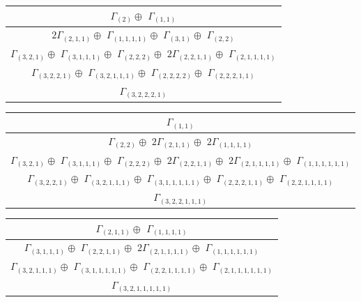 \documentclass[main.tex]{subfiles}
\begin{document}
\begin{minipage}{.5\textwidth}
\centering
\begin{tabular}{c}
$\Gamma_{(
2
)} \oplus$
$\Gamma_{(
1 , 
1
)}$
\\ \hline
$2\Gamma_{(
2 , 
1 , 
1
)} \oplus$
$\Gamma_{(
1 , 
1 , 
1 , 
1
)} \oplus$
$\Gamma_{(
3 , 
1
)} \oplus$
$\Gamma_{(
2 , 
2
)}$
\\ \hline
$\Gamma_{(
3 , 
2 , 
1
)} \oplus$
$\Gamma_{(
3 , 
1 , 
1 , 
1
)} \oplus$
$\Gamma_{(
2 , 
2 , 
2
)} \oplus$
$2\Gamma_{(
2 , 
2 , 
1 , 
1
)} \oplus$
$\Gamma_{(
2 , 
1 , 
1 , 
1 , 
1
)}$
\\ \hline
$\Gamma_{(
3 , 
2 , 
2 , 
1
)} \oplus$
$\Gamma_{(
3 , 
2 , 
1 , 
1 , 
1
)} \oplus$
$\Gamma_{(
2 , 
2 , 
2 , 
2
)} \oplus$
$\Gamma_{(
2 , 
2 , 
2 , 
1 , 
1
)}$
\\ \hline
$\Gamma_{(
3 , 
2 , 
2 , 
2 , 
1
)}$
\\
\end{tabular}\end{minipage}
\bigskip
\begin{minipage}{1\textwidth}
\centering
\begin{tabular}{c}
$\Gamma_{(
1 , 
1
)}$
\\ \hline
$\Gamma_{(
2 , 
2
)} \oplus$
$2\Gamma_{(
2 , 
1 , 
1
)} \oplus$
$2\Gamma_{(
1 , 
1 , 
1 , 
1
)} $
\\ \hline
$\Gamma_{(
3 , 
2 , 
1
)} \oplus$
$\Gamma_{(
3 , 
1 , 
1 , 
1
)} \oplus$
$\Gamma_{(
2 , 
2 , 
2
)} \oplus$
$2\Gamma_{(
2 , 
2 , 
1 , 
1
)} \oplus$
$2\Gamma_{(
2 , 
1 , 
1 , 
1 , 
1
)} \oplus$
$\Gamma_{(
1 , 
1 , 
1 , 
1 , 
1 , 
1
)}$
\\ \hline
$\Gamma_{(
3 , 
2 , 
2 , 
1
)} \oplus$
$\Gamma_{(
3 , 
2 , 
1 , 
1 , 
1
)} \oplus$
$\Gamma_{(
3 , 
1 , 
1 , 
1 , 
1 , 
1
)} \oplus$
$\Gamma_{(
2 , 
2 , 
2 , 
1 , 
1
)} \oplus$
$\Gamma_{(
2 , 
2 , 
1 , 
1 , 
1 , 
1
)}$
\\ \hline
$\Gamma_{(
3 , 
2 , 
2 , 
1 , 
1 , 
1
)}$
\\
\end{tabular}\end{minipage}
\bigskip
\begin{minipage}{.55\textwidth}
\centering
\begin{tabular}{c}
$\Gamma_{(
2 , 
1 , 
1
)} \oplus$
$\Gamma_{(
1 , 
1 , 
1 , 
1
)}$
\\ \hline
$\Gamma_{(
3 , 
1 , 
1 , 
1
)} \oplus$
$\Gamma_{(
2 , 
2 , 
1 , 
1
)} \oplus$
$2\Gamma_{(
2 , 
1 , 
1 , 
1 , 
1
)} \oplus$
$\Gamma_{(
1 , 
1 , 
1 , 
1 , 
1 , 
1
)}$
\\ \hline
$\Gamma_{(
3 , 
2 , 
1 , 
1 , 
1
)} \oplus$
$\Gamma_{(
3 , 
1 , 
1 , 
1 , 
1 , 
1
)} \oplus$
$\Gamma_{(
2 , 
2 , 
1 , 
1 , 
1 , 
1
)} \oplus$
$\Gamma_{(
2 , 
1 , 
1 , 
1 , 
1 , 
1 , 
1
)}$
\\ \hline
$\Gamma_{(
3 , 
2 , 
1 , 
1 , 
1 , 
1 , 
1
)}$
\\
\end{tabular}\end{minipage}
\end{document}

